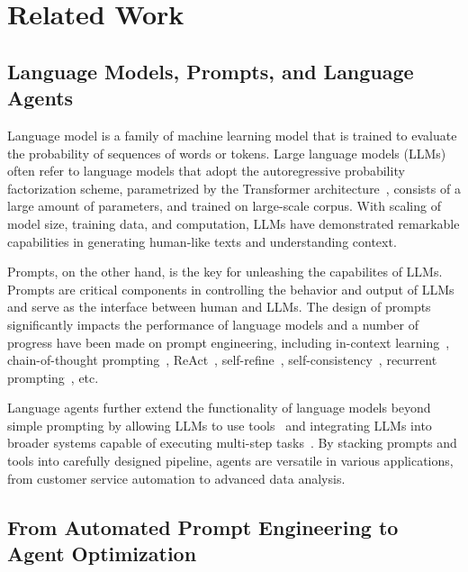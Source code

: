 \section{Related Work}

\subsection{Language Models, Prompts, and Language Agents}

Language model is a family of machine learning model that is trained to evaluate the probability of sequences of words or tokens. Large language models (LLMs)~\citep{gpt,gpt2,gpt3,gpt3.5,gpt4,llama,llama2}  often refer to language models that adopt the autoregressive probability factorization scheme, parametrized by the Transformer architecture~\citep{vaswani2017attention}, consists of a large amount of parameters, and trained on large-scale corpus. With scaling of model size, training data, and computation, LLMs have demonstrated remarkable capabilities in generating human-like texts and understanding context. 

Prompts, on the other hand, is the key for unleashing the capabilites of LLMs. Prompts are critical components in controlling the behavior and output of LLMs and serve as the interface between human and LLMs. The design of prompts significantly impacts the performance of language models and a number of progress have been made on prompt engineering, including in-context learning~\citep{gpt3}, chain-of-thought prompting~\citep{nye2022show, wei2022chain}, ReAct~\citep{yao2022react}, self-refine~\citep{madaan2023selfrefine}, self-consistency~\citep{wang2023selfconsistency}, recurrent prompting~\citep{zhou2023recurrentgpt}, etc.

Language agents further extend the functionality of language models beyond simple prompting by allowing LLMs to use tools~\citep{schick2023toolformer} and integrating LLMs into broader systems capable of executing multi-step tasks~\citep{park2023generative,hong2023metagpt,zhou2023agents,chen2023agentverse,OpenAgents}. By stacking prompts and tools into carefully designed pipeline, agents are versatile in various applications, from customer service automation to advanced data analysis. 

\subsection{From Automated Prompt Engineering to Agent Optimization}

